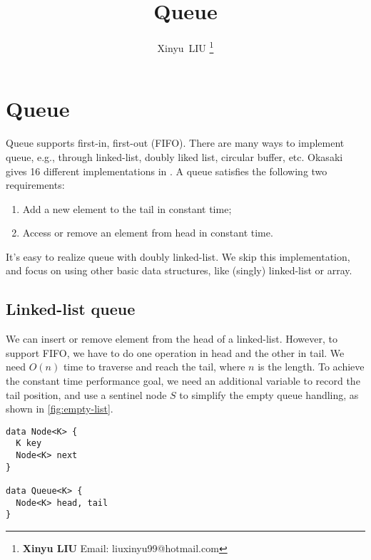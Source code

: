 \documentclass[b5paper]{article}
\begin{document}
\title{Queue}

\author{Xinyu~LIU
\thanks{{\bfseries Xinyu LIU} \newline
  Email: liuxinyu99@hotmail.com \newline}
  }

\maketitle
\fi


\ifx\wholebook\relax
\chapter{Queue}
\fi

Queue supports first-in, first-out (FIFO). There are many ways to implement queue, e.g., through linked-list, doubly liked list, circular buffer, etc. Okasaki gives 16 different implementations in \cite{okasaki-book}. A queue satisfies the following two requirements:

\begin{enumerate}
\item Add a new element to the tail in constant time;
\item Access or remove an element from head in constant time.
\end{enumerate}

It's easy to realize queue with doubly linked-list. We skip this implementation, and focus on using other basic data structures, like (singly) linked-list or array.

\section{Linked-list queue}

We can insert or remove element from the head of a linked-list. However, to support FIFO, we have to do one operation in head and the other in tail. We need $O(n)$ time to traverse and reach the tail, where $n$ is the length. To achieve the constant time performance goal, we need an additional variable to record the tail position, and use a sentinel node $S$ to simplify the empty queue handling, as shown in \cref{fig:empty-list}.

\lstset{frame = single}
\begin{lstlisting}[language = Bourbaki]
data Node<K> {
  K key
  Node<K> next
}

data Queue<K> {
  Node<K> head, tail
}
\end{lstlisting}
\end{document}
